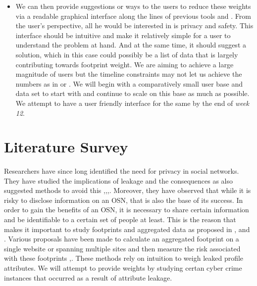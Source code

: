 \documentclass[11pt]{article}
\begin{document}
\begin{itemize}
   \item We can then provide suggestions or ways to the users to reduce these weights via a readable graphical interface along the lines of previous tools \cite{privaware} and \cite{privometer}. From the user’s perspective, all he would be interested in is privacy and safety. This interface should be intuitive and make it relatively simple for a user to understand the problem at hand. And at the same time, it should suggest a solution, which in this case could possibly be a list of data that is largely contributing towards footprint weight. We are aiming to achieve a large magnitude of users but the timeline constraints may not let us achieve the numbers as in \cite{emergingthreat} or \cite{privacypaper}. We will begin with a comparatively small user base and data set to start with and continue to scale on this base as much as possible. We attempt to have a user friendly interface for the same by the end of {\sl week 12}.
   \end{itemize}

\section{Literature Survey}

\paragraph{}
Researchers have since long identified the need for privacy in social networks. They have studied the implications of leakage and the consequences as also suggested methods to avoid this \cite{emergingthreat},\cite{inforevelation},\cite{privacypaper},\cite{undermining}. Moreover, they have observed that while it is risky to disclose information on an OSN, that is also the base of its success. In order to gain the benefits of an OSN, it is necessary to share certain information and be identifiable to a certain set of people at least. This is the reason that makes it important to study footprints and aggregated data as proposed in \cite{emergingthreat},\cite{leakage} and \cite{paas}. Various proposals have been made to calculate an aggregated footprint on a single website or spanning multiple sites and then measure the risk associated with these footprints \cite{socialgraph},\cite{framework}. These methods rely on intuition to weigh leaked profile attributes. We will attempt to provide weights by studying certan cyber crime instances that occurred as a result of attribute leakage.
\end{document}
